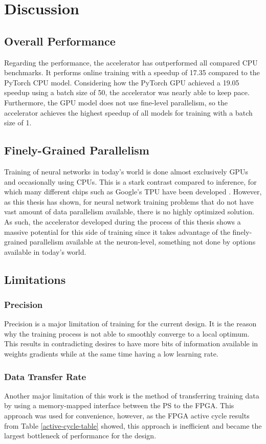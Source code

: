 \chapter{Discussion}\label{discussion}
\section{Overall Performance}
Regarding the performance, the accelerator has outperformed all compared CPU benchmarks. It performs online training with a speedup of 17.35 compared to the PyTorch CPU model. Considering how the PyTorch GPU achieved a 19.05 speedup using a batch size of 50, the accelerator was nearly able to keep pace. Furthermore, the GPU model does not use fine-level parallelism, so the accelerator achieves the highest speedup of all models for training with a batch size of 1.

\section{Finely-Grained Parallelism}
Training of neural networks in today's world is done almost exclusively GPUs and occasionally using CPUs. This is a stark contrast compared to inference, for which many different chips such as Google's TPU have been developed \cite{TPU}. However, as this thesis has shown, for neural network training problems that do not have vast amount of data parallelism available, there is no highly optimized solution. As such, the accelerator developed during the process of this thesis shows a massive potential for this side of training since it takes advantage of the finely-grained parallelism available at the neuron-level, something not done by options available in today's world.

\section{Limitations}
\subsection{Precision}
Precision is a major limitation of training for the current design. It is the reason why the training process is not able to smoothly converge to a local optimum. This results in contradicting desires to have more bits of information available in weights gradients while at the same time having a low learning rate.

\subsection{Data Transfer Rate}
Another major limitation of this work is the method of transferring training data by using a memory-mapped interface between the PS to the FPGA. This approach was used for convenience, however, as the FPGA active cycle results from Table \ref{active-cycle-table} showed, this approach is inefficient and became the largest bottleneck of performance for the design.


